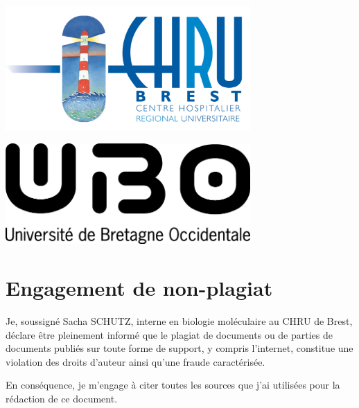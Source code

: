 \documentclass[12pt,a4paper]{article}
\begin{document}
\begin{titlepage}
\begin{minipage}[c]{0.3\textwidth}
   \includegraphics[width=0.7\textwidth]{img/logo_brest.jpg}\hfill
\end{minipage}
\begin{minipage}[c]{0.3\textwidth}
   \includegraphics[width=0.7\textwidth]{img/ubo.png}
\end{minipage}
% 
 
 
 
\vfill %

\end{titlepage}



\newpage

\section*{Engagement de non-plagiat}

Je, soussigné Sacha SCHUTZ, interne en biologie moléculaire au CHRU de Brest, déclare être pleinement informé que le plagiat de
documents ou de parties de documents publiés sur toute forme de
support, y compris l'internet, constitue une violation des droits
d'auteur ainsi qu'une fraude caractérisée.

En conséquence, je m'engage à citer toutes les sources que j'ai
utilisées pour la rédaction de ce document.
\end{document}
